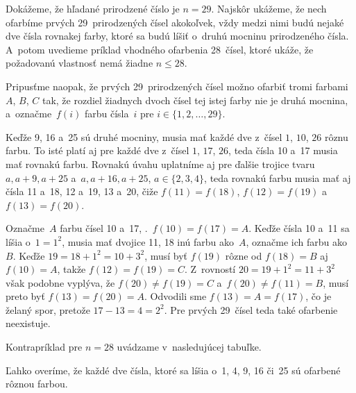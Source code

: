 {%
Dokážeme, že hľadané prirodzené číslo je $n=29$. Najskôr ukážeme, že nech
ofarbíme prvých 29~prirodzených čísel akokoľvek, vždy medzi nimi budú
nejaké dve čísla rovnakej farby, ktoré sa budú líšiť o~druhú mocninu prirodzeného čísla.
A~potom uvedieme príklad vhodného ofarbenia 28~čísel, ktoré ukáže,
že požadovanú vlastnosť nemá žiadne $n\le28$.

Pripusťme naopak, že prvých 29~prirodzených čísel možno ofarbiť
tromi farbami $A$, $B$, $C$ tak,
že rozdiel žiadnych dvoch čísel tej istej farby nie je druhá mocnina,
a~označme~$f(i)$ farbu čísla~$i$ pre
$i\in\{1, 2, \dots, 29\}$.

Keďže 9, 16 a~25 sú druhé mocniny, musia mať každé dve z~čísel
$1$, $10$, $26$ rôznu farbu. To isté platí aj pre každé dve z~čísel $1$, $17$, $26$,
teda čísla 10 a~17 musia mať rovnakú farbu.
Rovnakú úvahu uplatníme aj pre ďalšie trojice tvaru $a,a+9,a+25$ a~$a,a+16,a+25$,
$a\in\{2, 3, 4\}$, teda rovnakú farbu musia mať aj čísla 11 a~18, 12 a~19,
13 a~20, čiže $f(11)=f(18)$, $f(12)=f(19)$ a~$f(13)=f(20)$.

Označme~$A$ farbu čísel 10 a~17, \tj.~$f(10)=f(17)=A$.
Keďže čísla 10 a~11 sa líšia
o~$1=1^2$, musia mať dvojice 11, 18 inú farbu ako~$A$, označme
ich farbu ako~$B$.
Keďže
$19=18+1^2=10+3^2$, musí byť $f(19)$ rôzne od $f(18)=B$ aj~$f(10)=A$,
takže $f(12)=f(19)=C$. Z~rovností $20=19+1^2=11+3^2$ však podobne vyplýva, že
$f(20)\ne f(19)=C$ a~$f(20)\ne f(11)=B$, musí preto byť
$f(13)=f(20)=A$. Odvodili sme $f(13)=A=f(17)$, čo je želaný spor,
pretože $17-13=4=2^2$. Pre prvých 29~čísel teda také ofarbenie neexistuje.

Kontrapríklad pre $n=28$ uvádzame v~nasledujúcej tabuľke.
%

Ľahko overíme, že každé dve čísla, ktoré sa líšia o~1, 4, 9, 16 či~25
sú ofarbené rôznou farbou.
}

